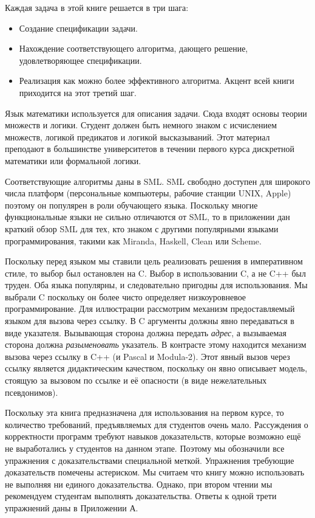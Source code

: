 Каждая задача в этой книге решается в три шага:

\begin{itemize}
\item{Создание спецификации задачи.}

\item{Нахождение соответствующего алгоритма, дающего решение, удовлетворяющее спецификации.}

\item{Реализация как можно более эффективного алгоритма. Акцент всей книги приходится на этот третий шаг.}
\end{itemize}

Язык математики используется для описания задачи. Сюда входят основы теории множеств и логики. Студент должен быть немного знаком с исчислением множеств, логикой предикатов и логикой высказываний. Этот материал преподают в большинстве университетов в течении первого курса дискретной математики или формальной логики.

Соответствующие алгоритмы даны в SML. SML свободно доступен для широкого числа платформ (персональные компьютеры, рабочие станции UNIX, Apple) поэтому он популярен в роли обучающего языка. Поскольку многие функциональные языки не сильно отличаются от SML, то в приложении дан краткий обзор SML для тех, кто знаком с другими популярными языками программирования, такими как Miranda, Haskell, Clean или Scheme.

Поскольку перед языком мы ставили цель реализовать решения в императивном стиле, то выбор был остановлен на C. Выбор в использовании C, а не C++ был труден. Оба языка популярны, и следовательно пригодны для использования. Мы выбрали C поскольку он более чисто определяет низкоуровневое программирование. Для иллюстрации рассмотрим механизм предоставляемый языком для вызова через ссылку. В C аргументы должны явно передаваться в виде указателя. Вызывающая сторона должна передать \emph{адрес}, а вызываемая сторона должна \emph{разыменовать} указатель. В контрасте этому находится механизм вызова через ссылку в C++ (и Pascal и Modula-2). Этот явный вызов через ссылку является дидактическим качеством, поскольку он явно описывает модель, стоящую за вызовом по ссылке и её опасности (в виде нежелательных псевдонимов).

Поскольку эта книга предназначена для использования на первом курсе, то количество требований, предъявляемых для студентов очень мало. Рассуждения о корректности программ требуют навыков доказательств, которые возможно ещё не выработались у студентов на данном этапе. Поэтому мы обозначили все упражнения с доказательствами специальной меткой. Упражнения требующие доказательств помечены астериском. Мы считаем что книгу можно использовать не выполняя ни единого доказательства. Однако, при втором чтении мы рекомендуем студентам выполнять доказательства. Ответы к одной трети упражнений даны в Приложении А.

